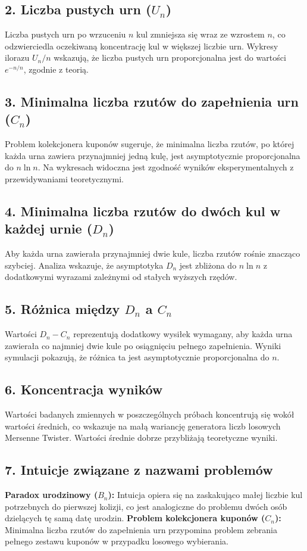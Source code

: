 \documentclass{article}
\begin{document}
\subsection*{2. Liczba pustych urn ($U_n$)}
Liczba pustych urn po wrzuceniu $n$ kul zmniejsza się wraz ze wzrostem $n$, co odzwierciedla oczekiwaną koncentrację kul w większej liczbie urn. Wykresy ilorazu $U_n/n$ wskazują, że liczba pustych urn proporcjonalna jest do wartości $e^{-n/n}$, zgodnie z teorią.

\subsection*{3. Minimalna liczba rzutów do zapełnienia urn ($C_n$)}
Problem kolekcjonera kuponów sugeruje, że minimalna liczba rzutów, po której każda urna zawiera przynajmniej jedną kulę, jest asymptotycznie proporcjonalna do $n \ln n$. Na wykresach widoczna jest zgodność wyników eksperymentalnych z przewidywaniami teoretycznymi.

\subsection*{4. Minimalna liczba rzutów do dwóch kul w każdej urnie ($D_n$)}
Aby każda urna zawierała przynajmniej dwie kule, liczba rzutów rośnie znacząco szybciej. Analiza wskazuje, że asymptotyka $D_n$ jest zbliżona do $n \ln n$ z dodatkowymi wyrazami zależnymi od stałych wyższych rzędów.

\subsection*{5. Różnica między $D_n$ a $C_n$}
Wartości $D_n - C_n$ reprezentują dodatkowy wysiłek wymagany, aby każda urna zawierała co najmniej dwie kule po osiągnięciu pełnego zapełnienia. Wyniki symulacji pokazują, że różnica ta jest asymptotycznie proporcjonalna do $n$.

\subsection*{6. Koncentracja wyników}
Wartości badanych zmiennych w poszczególnych próbach koncentrują się wokół wartości średnich, co wskazuje na małą wariancję generatora liczb losowych Mersenne Twister. Wartości średnie dobrze przybliżają teoretyczne wyniki.

\subsection*{7. Intuicje związane z nazwami problemów}
\textbf{Paradox urodzinowy ($B_n$):} Intuicja opiera się na zaskakująco małej liczbie kul potrzebnych do pierwszej kolizji, co jest analogiczne do problemu dwóch osób dzielących tę samą datę urodzin.
\textbf{Problem kolekcjonera kuponów ($C_n$):} Minimalna liczba rzutów do zapełnienia urn przypomina problem zebrania pełnego zestawu kuponów w przypadku losowego wybierania.
\end{document}
